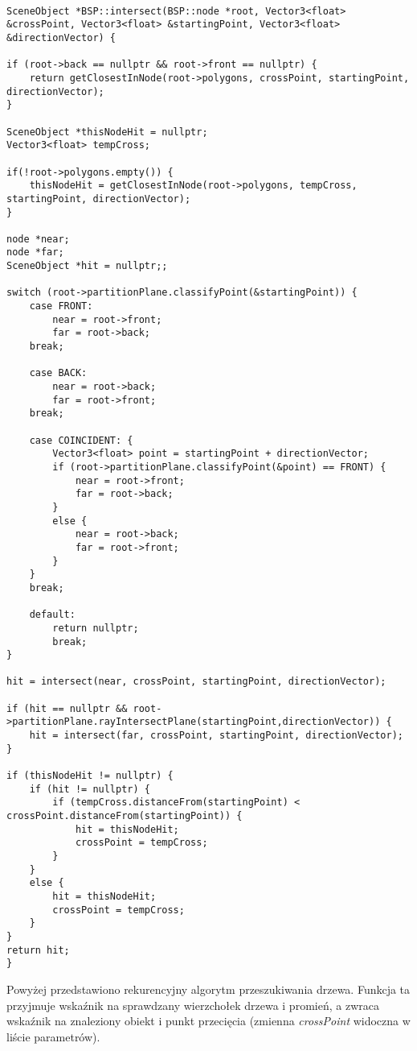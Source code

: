 \begin{lstlisting}[caption={Fragment klasy \emph{BSP} - przeglądanie drzewa}]

SceneObject *BSP::intersect(BSP::node *root, Vector3<float> &crossPoint, Vector3<float> &startingPoint, Vector3<float> &directionVector) {

if (root->back == nullptr && root->front == nullptr) {
    return getClosestInNode(root->polygons, crossPoint, startingPoint, directionVector);
}

SceneObject *thisNodeHit = nullptr;
Vector3<float> tempCross;

if(!root->polygons.empty()) {
    thisNodeHit = getClosestInNode(root->polygons, tempCross, startingPoint, directionVector);
}

node *near;
node *far;
SceneObject *hit = nullptr;;

switch (root->partitionPlane.classifyPoint(&startingPoint)) {
    case FRONT:
        near = root->front;
        far = root->back;
    break;

    case BACK:
        near = root->back;
        far = root->front;
    break;

    case COINCIDENT: {
        Vector3<float> point = startingPoint + directionVector;
        if (root->partitionPlane.classifyPoint(&point) == FRONT) {
            near = root->front;
            far = root->back;
        }
        else {
            near = root->back;
            far = root->front;
        }
    }
    break;

    default:
        return nullptr;
        break;
}

hit = intersect(near, crossPoint, startingPoint, directionVector);

if (hit == nullptr && root->partitionPlane.rayIntersectPlane(startingPoint,directionVector)) {
    hit = intersect(far, crossPoint, startingPoint, directionVector);
}

if (thisNodeHit != nullptr) {
    if (hit != nullptr) {
        if (tempCross.distanceFrom(startingPoint) < crossPoint.distanceFrom(startingPoint)) {
            hit = thisNodeHit;
            crossPoint = tempCross;
        }
    }
    else {
        hit = thisNodeHit;
        crossPoint = tempCross;
    }
}
return hit;
}

\end{lstlisting}

Powyżej przedstawiono rekurencyjny algorytm przeszukiwania drzewa. Funkcja ta przyjmuje wskaźnik na sprawdzany wierzchołek drzewa i promień, a zwraca wskaźnik na znaleziony obiekt i punkt przecięcia (zmienna \emph{crossPoint} widoczna w liście parametrów).

